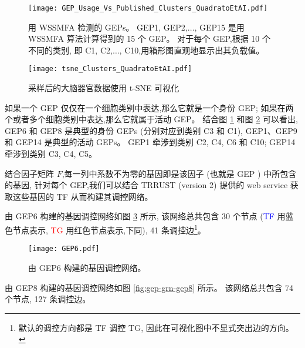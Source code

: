 \begin{figure}[!htbp]
    \centering
    \texttt{[image: GEP\_Usage\_Vs\_Published\_Clusters\_QuadratoEtAI.pdf]}
    \caption{
    用 WSSMFA 检测的 GEPs。
    GEP1, GEP2,$\ldots$, GEP15 是用 WSSMFA 算法计算得到的 15 个 GEP。
    对于每个 GEP,根据 10 个不同的类别,
    即 C1, C2,$\ldots$, C10,用箱形图直观地显示出其负载值。 
    }
    \label{fig:gep-gep}
\end{figure}


\begin{figure}[!htbp]
    \centering
    \texttt{[image: tsne\_Clusters\_QuadratoEtAI.pdf]}
    \caption{
    采样后的大脑器官数据使用 t-SNE 可视化
    }
    \label{fig:gep-tsne}
\end{figure}

如果一个 GEP 仅仅在一个细胞类别中表达,那么它就是一个身份 GEP;
如果在两个或者多个细胞类别中表达,那么它就属于活动 GEP。
结合图 \ref{fig:gep-gep} 和图 \ref{fig:gep-tsne} 可以看出, 
GEP6 和 GEP8 是典型的身份 GEPs (分别对应到类别 C3 和 C1), GEP1、GEP9 和 GEP14 是典型的活动 GEPs。
GEP1 牵涉到类别 C2, C4, C6 和 C10; GEP14 牵涉到类别 C3, C4, C5。


结合因子矩阵 $F$,每一列中系数不为零的基因即是该因子 (也就是 GEP ) 中所包含的基因,
针对每个 GEP,我们可以结合 TRRUST (version 2) 提供的 web service 获取这些基因的 TF 从而构建其调控网络。

由 GEP6 构建的基因调控网络如图 \ref{fig:gep-grn-gep6} 所示,
该网络总共包含 30 个节点 (\textcolor{blue}{TF} 用蓝色节点表示, \textcolor{red}{TG} 用红色节点表示,下同), 41 条调控边\footnote{默认的调控方向都是 TF 调控 TG, 因此在可视化图中不显式突出边的方向。
}。
\begin{figure}[!htbp]
    \centering
    \texttt{[image: GEP6.pdf]}
    \caption{由 GEP6 构建的基因调控网络。}
    \label{fig:gep-grn-gep6}
\end{figure}

由 GEP8 构建的基因调控网络如图 \ref{fig:gep-grn-gep8} 所示。
该网络总共包含 74 个节点, 127 条调控边。

